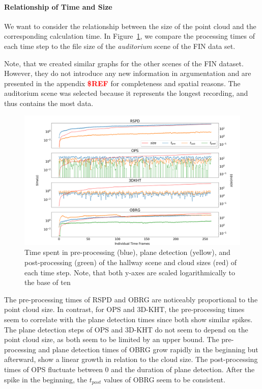 \documentclass[main.tex]{subfiles}
\begin{document}
\paragraph{Relationship of Time and Size}

We want to consider the relationship between the size of the point cloud and the corresponding calculation time.
In Figure~\ref{fig:dynaudi}, we compare the processing times of each time step to the file size of the
\textit{auditorium} scene of the FIN data set.

Note, that we created similar graphs for the other scenes of the FIN dataset.
However, they do not introduce any new information in argumentation and are presented in the appendix \textbf{\textcolor{red}{\$REF}} for completeness
and spatial reasons.
The auditorium scene was selected because it represents the longest recording, and thus contains the most data.

\begin{figure}[H]
    \centering
    \includegraphics[width=\textwidth]{images/dyn_time-audi.png}
    \caption[Time Results Hallway]{Time spent in pre-processing (blue), plane detection (yellow), and post-processing
        (green) of the hallway scene and cloud sizes (red) of each time step. Note, that both y-axes are scaled
        logarithmically to the base of ten}
    \label{fig:dynaudi}
\end{figure}

The pre-processing times of RSPD and OBRG are noticeably proportional to the point cloud size.
In contrast, for OPS and 3D-KHT, the pre-processing times seem to correlate with the plane detection times since
both show similar spikes. The plane detection steps of OPS and 3D-KHT do not seem to depend on the point cloud size,
as both seem to be limited by an upper bound. The pre-processing and plane detection times of OBRG grow rapidly in the
beginning but afterward, show a linear growth in relation to the cloud size. The post-processing times of OPS fluctuate
between 0 and the duration of plane detection. After the spike in the beginning, the $t_{post}$ values of OBRG seem to be
consistent.
\end{document}
